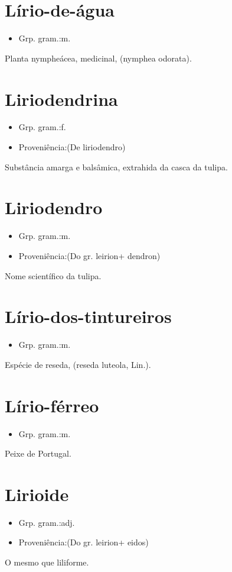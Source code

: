 \section{Lírio-de-água}
\begin{itemize}
\item {Grp. gram.:m.}
\end{itemize}
Planta nympheácea, medicinal, (\textunderscore nymphea odorata\textunderscore ).
\section{Liriodendrina}
\begin{itemize}
\item {Grp. gram.:f.}
\end{itemize}
\begin{itemize}
\item {Proveniência:(De \textunderscore liriodendro\textunderscore )}
\end{itemize}
Substância amarga e balsâmica, extrahida da casca da tulipa.
\section{Liriodendro}
\begin{itemize}
\item {Grp. gram.:m.}
\end{itemize}
\begin{itemize}
\item {Proveniência:(Do gr. \textunderscore leirion\textunderscore  + \textunderscore dendron\textunderscore )}
\end{itemize}
Nome scientífico da tulipa.
\section{Lírio-dos-tintureiros}
\begin{itemize}
\item {Grp. gram.:m.}
\end{itemize}
Espécie de reseda, (\textunderscore reseda luteola\textunderscore , Lin.).
\section{Lírio-férreo}
\begin{itemize}
\item {Grp. gram.:m.}
\end{itemize}
Peixe de Portugal.
\section{Lirioide}
\begin{itemize}
\item {Grp. gram.:adj.}
\end{itemize}
\begin{itemize}
\item {Proveniência:(Do gr. \textunderscore leirion\textunderscore  + \textunderscore eidos\textunderscore )}
\end{itemize}
O mesmo que \textunderscore liliforme\textunderscore .
